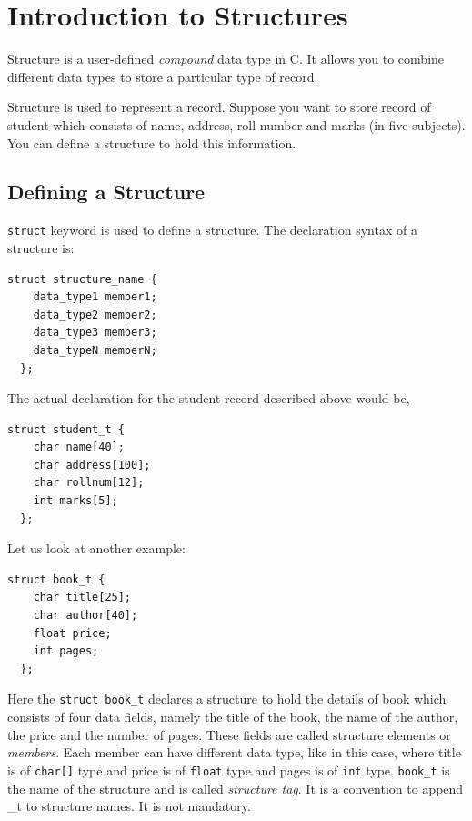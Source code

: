 \documentclass[11pt,a4paper]{article}
\author{TalentSprint}
\date{}
\begin{document}

\section*{Introduction to Structures}
Structure is a user-defined \emph{compound} data type in C. It allows you to combine different data types to store a particular type of record. 

Structure is used to represent a record. Suppose you want to store record of student which consists of name, address, roll number and marks (in five subjects). You can define a structure to hold this information.

\subsection*{Defining a Structure}
\lstinline!struct! keyword is used to define a structure. The declaration syntax of a structure is:

\begin{lstlisting}[numbers=none]
  struct structure_name {
    data_type1 member1;
    data_type2 member2;
    data_type3 member3;
    data_typeN memberN;
  };
\end{lstlisting}

The actual declaration for the student record described above would be,
\begin{lstlisting}[numbers=none]
  struct student_t {
    char name[40];
    char address[100];
    char rollnum[12];
    int marks[5];
  }; 
\end{lstlisting}

Let us look at another example:
\begin{lstlisting}[numbers=none]
  struct book_t {
    char title[25];
    char author[40];
    float price;
    int pages;
  };
\end{lstlisting}

Here the \lstinline!struct book_t! declares a structure to hold the details of book which consists of four data fields, namely the title of the book, the name of the author, the price and the number of pages. These fields are called structure elements or \emph{members}. Each member can have different data type, like in this case, where title is of \lstinline!char[]! type and price is of \lstinline!float! type and pages is of \lstinline!int! type. \texttt{book\_t} is the name of the structure and is called \emph{structure tag}. It is a convention to append \_t to structure names. It is not mandatory.
\end{document}
